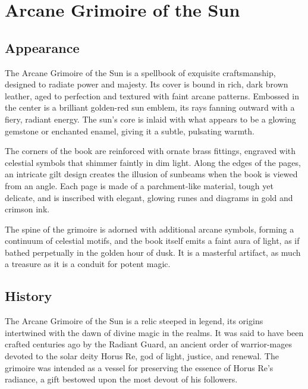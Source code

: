 \ItemSubCategory{}

\chapter*{Arcane Grimoire of the Sun}
\section*{Appearance}
The Arcane Grimoire of the Sun is a spellbook of exquisite craftsmanship, designed to radiate power and majesty. Its cover is bound in rich, dark brown leather, aged to perfection and textured with faint arcane patterns. Embossed in the center is a brilliant golden-red sun emblem, its rays fanning outward with a fiery, radiant energy. The sun's core is inlaid with what appears to be a glowing gemstone or enchanted enamel, giving it a subtle, pulsating warmth.

The corners of the book are reinforced with ornate brass fittings, engraved with celestial symbols that shimmer faintly in dim light. Along the edges of the pages, an intricate gilt design creates the illusion of sunbeams when the book is viewed from an angle. Each page is made of a parchment-like material, tough yet delicate, and is inscribed with elegant, glowing runes and diagrams in gold and crimson ink.

The spine of the grimoire is adorned with additional arcane symbols, forming a continuum of celestial motifs, and the book itself emits a faint aura of light, as if bathed perpetually in the golden hour of dusk. It is a masterful artifact, as much a treasure as it is a conduit for potent magic.

\section*{History}
The Arcane Grimoire of the Sun is a relic steeped in legend, its origins intertwined with the dawn of divine magic in the realms. It was said to have been crafted centuries ago by the Radiant Guard, an ancient order of warrior-mages devoted to the solar deity Horus Re, god of light, justice, and renewal. The grimoire was intended as a vessel for preserving the essence of Horus Re's radiance, a gift bestowed upon the most devout of his followers.

